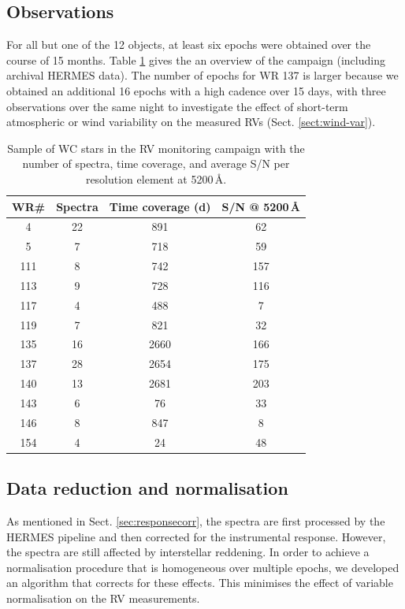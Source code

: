 \subsection{Observations}
For all but one of the 12 objects, at least six epochs were obtained over the course of 15 months. Table \ref{tab:epochs} gives the an overview of the campaign (including archival HERMES data). The number of epochs for WR 137 is larger because we obtained an additional 16 epochs with a high cadence over 15 days, with three observations over the same night to investigate the effect of short-term atmospheric or wind variability on the measured RVs (Sect. \ref{sect:wind-var}). 
\begin{table}
\centering
\caption{Sample of WC stars in the RV monitoring campaign with the number of spectra, time coverage, and average S/N per resolution element at 5200\,\r{A}.}
\begin{tabular}{cccc}
\hline \hline
WR\# & Spectra & Time coverage (d) & S/N @ 5200\,\r{A} \\ \hline 
4 & 22 & 891 & 62 \\ 
5 & 7 & 718 & 59 \\ 
111 & 8 & 742 & 157 \\ 
113 & 9 & 728 & 116 \\ 
117 & 4 & 488 & 7 \\ 
119 & 7 & 821 & 32 \\ 
135 & 16 & 2660 & 166 \\
137 & 28 & 2654 & 175 \\
140 & 13 & 2681 & 203 \\
143 & 6 & 76 & 33 \\ 
146 & 8 & 847 & 8 \\
154 & 4 & 24 & 48 \\ \hline
\end{tabular}
\label{tab:epochs}
\end{table}

\subsection{Data reduction and normalisation}
As mentioned in Sect. \ref{sec:responsecorr}, the spectra are first processed by the HERMES pipeline and then corrected for the instrumental response. However, the spectra are still affected by interstellar reddening. In order to achieve a normalisation procedure that is homogeneous over multiple epochs, we developed an algorithm that corrects for these effects. This minimises the effect of variable normalisation on the RV measurements.


